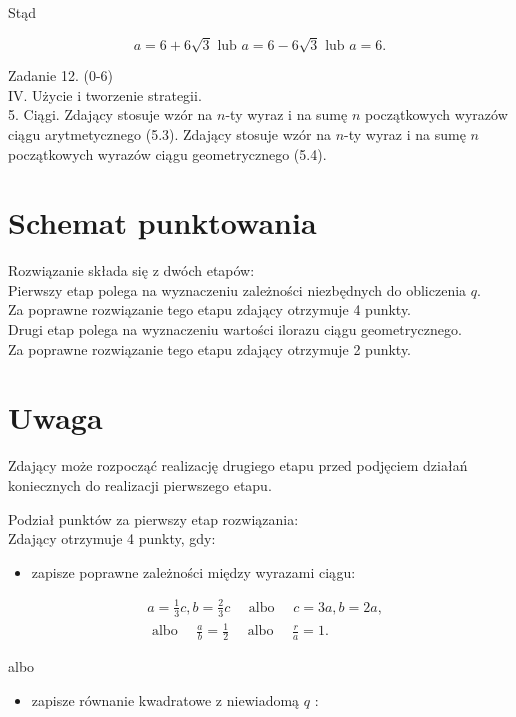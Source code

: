 \documentclass[10pt]{article}
\begin{document}
Stąd

$$
a=6+6 \sqrt{3} \text { lub } a=6-6 \sqrt{3} \text { lub } a=6 .
$$

Zadanie 12. (0-6)\\
IV. Użycie i tworzenie strategii.\\
5. Ciągi. Zdający stosuje wzór na $n$-ty wyraz i na sumę $n$ początkowych wyrazów ciągu arytmetycznego (5.3). Zdający stosuje wzór na $n$-ty wyraz i na sumę $n$ początkowych wyrazów ciągu geometrycznego (5.4).

\section*{Schemat punktowania}
Rozwiązanie składa się z dwóch etapów:\\
Pierwszy etap polega na wyznaczeniu zależności niezbędnych do obliczenia $q$.\\
Za poprawne rozwiązanie tego etapu zdający otrzymuje 4 punkty.\\
Drugi etap polega na wyznaczeniu wartości ilorazu ciągu geometrycznego.\\
Za poprawne rozwiązanie tego etapu zdający otrzymuje 2 punkty.

\section*{Uwaga}
Zdający może rozpocząć realizację drugiego etapu przed podjęciem działań koniecznych do realizacji pierwszego etapu.

Podział punktów za pierwszy etap rozwiązania:\\
Zdający otrzymuje 4 punkty, gdy:

\begin{itemize}
  \item zapisze poprawne zależności między wyrazami ciągu:
\end{itemize}

$$
\begin{aligned}
& a=\frac{1}{3} c, b=\frac{2}{3} c \quad \text { albo } \quad c=3 a, b=2 a, \\
& \text { albo } \quad \frac{a}{b}=\frac{1}{2} \quad \text { albo } \quad \frac{r}{a}=1 .
\end{aligned}
$$

albo

\begin{itemize}
  \item zapisze równanie kwadratowe z niewiadomą $q$ :
\end{itemize}
\end{document}
